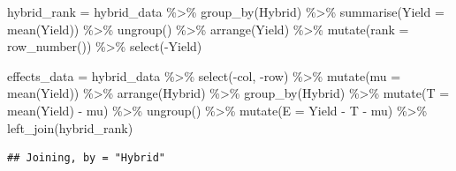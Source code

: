 \documentclass[
]{book}
\newenvironment{Shaded}{\begin{snugshade}}{\end{snugshade}}
\newcommand{\AttributeTok}[1]{\textcolor[rgb]{0.77,0.63,0.00}{#1}}
\newcommand{\DecValTok}[1]{\textcolor[rgb]{0.00,0.00,0.81}{#1}}
\newcommand{\FloatTok}[1]{\textcolor[rgb]{0.00,0.00,0.81}{#1}}
\newcommand{\FunctionTok}[1]{\textcolor[rgb]{0.00,0.00,0.00}{#1}}
\newcommand{\NormalTok}[1]{#1}
\newcommand{\OtherTok}[1]{\textcolor[rgb]{0.56,0.35,0.01}{#1}}
\newcommand{\SpecialCharTok}[1]{\textcolor[rgb]{0.00,0.00,0.00}{#1}}
\begin{document}
\begin{Shaded}
\begin{Highlighting}[]
\NormalTok{hybrid\_rank }\OtherTok{=}\NormalTok{ hybrid\_data }\SpecialCharTok{\%\textgreater{}\%}
  \FunctionTok{group\_by}\NormalTok{(Hybrid) }\SpecialCharTok{\%\textgreater{}\%}
  \FunctionTok{summarise}\NormalTok{(}\AttributeTok{Yield =} \FunctionTok{mean}\NormalTok{(Yield)) }\SpecialCharTok{\%\textgreater{}\%}
  \FunctionTok{ungroup}\NormalTok{() }\SpecialCharTok{\%\textgreater{}\%}
  \FunctionTok{arrange}\NormalTok{(Yield) }\SpecialCharTok{\%\textgreater{}\%}
  \FunctionTok{mutate}\NormalTok{(}\AttributeTok{rank =} \FunctionTok{row\_number}\NormalTok{()) }\SpecialCharTok{\%\textgreater{}\%}
  \FunctionTok{select}\NormalTok{(}\SpecialCharTok{{-}}\NormalTok{Yield)}

\NormalTok{effects\_data }\OtherTok{=}\NormalTok{ hybrid\_data }\SpecialCharTok{\%\textgreater{}\%}
  \FunctionTok{select}\NormalTok{(}\SpecialCharTok{{-}}\NormalTok{col, }\SpecialCharTok{{-}}\NormalTok{row) }\SpecialCharTok{\%\textgreater{}\%}
  \FunctionTok{mutate}\NormalTok{(}\AttributeTok{mu =} \FunctionTok{mean}\NormalTok{(Yield)) }\SpecialCharTok{\%\textgreater{}\%}
  \FunctionTok{arrange}\NormalTok{(Hybrid) }\SpecialCharTok{\%\textgreater{}\%}
  \FunctionTok{group\_by}\NormalTok{(Hybrid) }\SpecialCharTok{\%\textgreater{}\%}
  \FunctionTok{mutate}\NormalTok{(}\AttributeTok{T =} \FunctionTok{mean}\NormalTok{(Yield) }\SpecialCharTok{{-}}\NormalTok{ mu) }\SpecialCharTok{\%\textgreater{}\%}
  \FunctionTok{ungroup}\NormalTok{() }\SpecialCharTok{\%\textgreater{}\%}
  \FunctionTok{mutate}\NormalTok{(}\AttributeTok{E =}\NormalTok{ Yield }\SpecialCharTok{{-}}\NormalTok{ T }\SpecialCharTok{{-}}\NormalTok{ mu) }\SpecialCharTok{\%\textgreater{}\%}
  \FunctionTok{left\_join}\NormalTok{(hybrid\_rank)}
\end{Highlighting}
\end{Shaded}

\begin{verbatim}
## Joining, by = "Hybrid"
\end{verbatim}

\begin{Shaded}
\end{Shaded}
\end{document}
